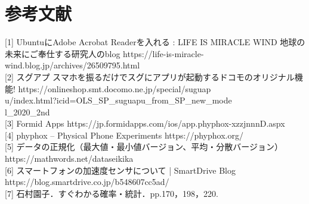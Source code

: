 \section{参考文献}
    [1] UbuntuにAdobe Acrobat Readerを入れる : LIFE IS MIRACLE WIND 地球の未来にご奉仕する研究人のblog https://life-is-miracle-wind.blog.jp/archives/26509795.html \\

    [2] スグアプ スマホを振るだけでスグにアプリが起動するドコモのオリジナル機能! https://onlineshop.smt.docomo.ne.jp/special/suguap\\
    u/index.html?icid=OLS_SP_suguapu_from_SP_new_mode\\
    l_2020_2nd \\

    [3] Formid Apps https://jp.formidapps.com/ios/app.phyphox-xzzjnnnD.aspx\\

    [4] phyphox – Physical Phone Experiments https://phyphox.org/\\

    [5] データの正規化（最大値・最小値バージョン、平均・分散バージョン）https://mathwords.net/dataseikika\\

    [6] スマートフォンの加速度センサについて | SmartDrive Blog https://blog.smartdrive.co.jp/b548607cc5ad/\\

    [7] 石村園子．すぐわかる確率・統計．pp.170，198，220.\\
